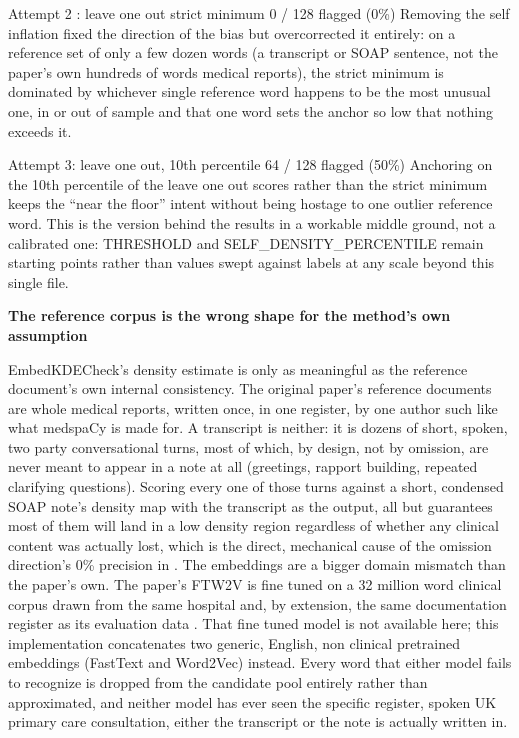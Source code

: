 \documentclass[11pt,a4paper]{article}
\begin{document}
Attempt 2 :  leave one out strict minimum 0 / 128 flagged (0\%) Removing the self inflation fixed the 
direction of the bias but overcorrected it entirely: on a reference set of only a few dozen words (a transcript or SOAP sentence, not the paper's own hundreds of words medical reports), the strict minimum is dominated by whichever single reference word happens to be the most unusual one, in or out of sample and that one word sets the anchor so low that nothing exceeds it. 

Attempt 3:  leave one out, 10th percentile  64 / 128 flagged (50\%) Anchoring on the 10th percentile of the leave one out scores rather than the strict minimum keeps the “near the floor” intent without being hostage to one outlier reference word. This is the version behind the results in  a workable middle ground, not a calibrated one: THRESHOLD and SELF\_DENSITY\_PERCENTILE remain  starting points rather than values swept against labels at any scale beyond this single file. 

\textbf{ The reference corpus is the wrong shape for the method's own assumption}

EmbedKDECheck's density estimate is only as meaningful as the reference document's own internal consistency. The original paper's reference documents are whole medical reports, written once, in one register, by one author such like what medspaCy is made for. A transcript is neither: it is dozens of short, spoken, two party conversational turns, most of which,  by design, not by omission, are never meant to appear in a note at all (greetings, rapport building, repeated clarifying questions). Scoring every one of those turns against a short, condensed SOAP note's density map with the transcript as the output, all but guarantees most of them will land in a low density region regardless of whether any clinical content was actually lost, which is the direct, mechanical cause of the omission direction's 0\% precision in . The embeddings are a bigger domain mismatch than the paper's own. The paper's FTW2V is fine tuned on a 32 million word clinical corpus drawn from the same hospital and, by extension, the same documentation register as its evaluation data \cite{oUKelmoun2025} . That fine tuned model is not available here; this implementation concatenates two generic, English, non clinical pretrained embeddings (FastText and Word2Vec) instead. Every word that either model fails to recognize is dropped from the candidate pool entirely rather than approximated, and neither model has ever seen the specific register,  spoken UK primary care consultation, either the transcript or the note is actually written in.
\end{document}
